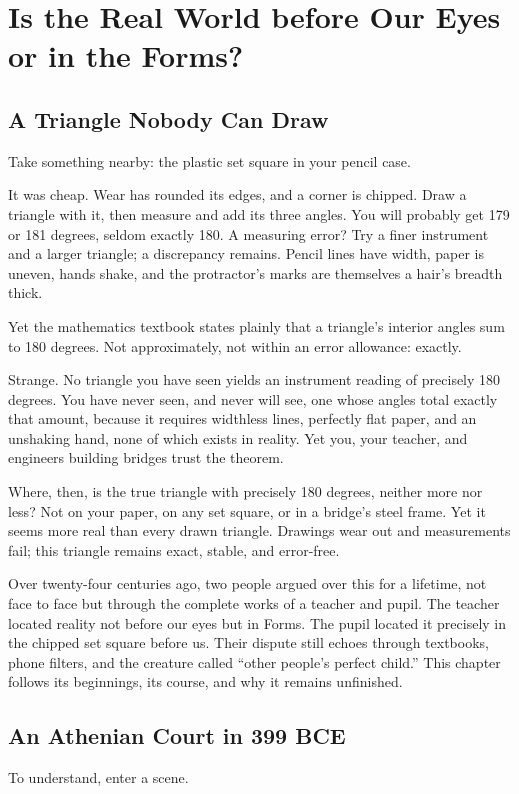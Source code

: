 \chapter[Reality before Us or in Forms?]{Is the Real World before Our Eyes or in the Forms?}
\section{A Triangle Nobody Can Draw}
Take something nearby: the plastic set square in your pencil case.

It was cheap. Wear has rounded its edges, and a corner is chipped. Draw a triangle with it, then measure and add its three angles. You will probably get 179 or 181 degrees, seldom exactly 180. A measuring error? Try a finer instrument and a larger triangle; a discrepancy remains. Pencil lines have width, paper is uneven, hands shake, and the protractor's marks are themselves a hair's breadth thick.

Yet the mathematics textbook states plainly that a triangle's interior angles sum to 180 degrees. Not approximately, not within an error allowance: exactly.

Strange. No triangle you have seen yields an instrument reading of precisely 180 degrees. You have never seen, and never will see, one whose angles total exactly that amount, because it requires widthless lines, perfectly flat paper, and an unshaking hand, none of which exists in reality. Yet you, your teacher, and engineers building bridges trust the theorem.

Where, then, is the true triangle with precisely 180 degrees, neither more nor less? Not on your paper, on any set square, or in a bridge's steel frame. Yet it seems more real than every drawn triangle. Drawings wear out and measurements fail; this triangle remains exact, stable, and error-free.

Over twenty-four centuries ago, two people argued over this for a lifetime, not face to face but through the complete works of a teacher and pupil. The teacher located reality not before our eyes but in Forms. The pupil located it precisely in the chipped set square before us. Their dispute still echoes through textbooks, phone filters, and the creature called ``other people's perfect child.'' This chapter follows its beginnings, its course, and why it remains unfinished.

\section{An Athenian Court in 399 BCE}
To understand, enter a scene.

